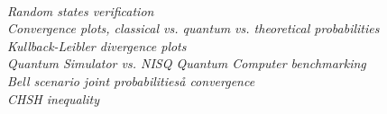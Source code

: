 \cite{software2023}\\
\textit{Random states verification}\\
\textit{Convergence plots, classical vs. quantum vs. theoretical probabilities}\\
\textit{Kullback-Leibler divergence plots}\\
\textit{Quantum Simulator vs. NISQ Quantum Computer benchmarking}\\
\textit{Bell scenario joint probabilitieså convergence}\\
\textit{CHSH inequality}